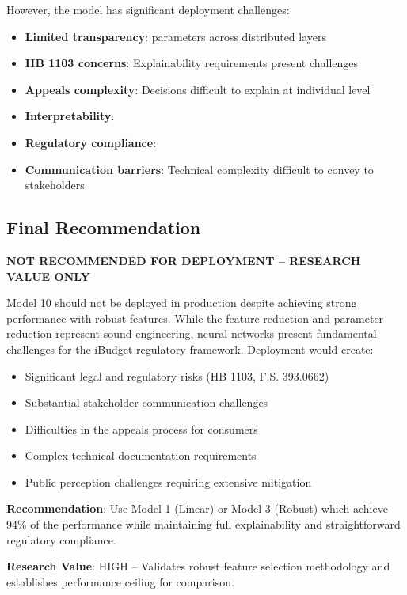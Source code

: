 However, the model has significant deployment challenges:
\begin{itemize}
    \item \textbf{Limited transparency}: \ModelTenTotalParams{} parameters across distributed layers
    \item \textbf{HB 1103 concerns}: Explainability requirements present challenges
    \item \textbf{Appeals complexity}: Decisions difficult to explain at individual level
    \item \textbf{Interpretability}: \ModelTenExplainability{}
    \item \textbf{Regulatory compliance}: \ModelTenRegulatoryCompliant{}
    \item \textbf{Communication barriers}: Technical complexity difficult to convey to stakeholders
\end{itemize}

\subsection{Final Recommendation}

\textbf{NOT RECOMMENDED FOR DEPLOYMENT -- RESEARCH VALUE ONLY}

Model 10 should not be deployed in production despite achieving strong performance with robust features. While the \ModelTenFeatureReduction{} feature reduction and \ModelTenParameterReduction{} parameter reduction represent sound engineering, neural networks present fundamental challenges for the iBudget regulatory framework. Deployment would create:

\begin{itemize}
    \item Significant legal and regulatory risks (HB 1103, F.S. 393.0662)
    \item Substantial stakeholder communication challenges
    \item Difficulties in the appeals process for consumers
    \item Complex technical documentation requirements
    \item Public perception challenges requiring extensive mitigation
\end{itemize}

\textbf{Recommendation}: Use Model 1 (Linear) or Model 3 (Robust) which achieve 94\% of the performance while maintaining full explainability and straightforward regulatory compliance.

\textbf{Research Value}: HIGH -- Validates robust feature selection methodology and establishes performance ceiling for comparison.

